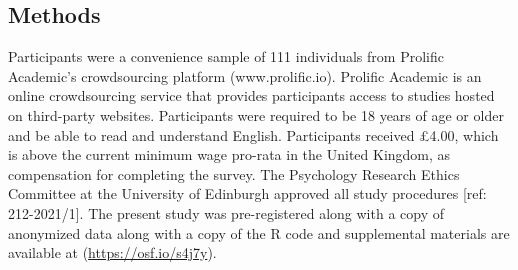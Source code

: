 \documentclass[
  donotrepeattitle,doc, 12pt, a4paper,floatsintext]{apa7}
\begin{document}
\hypertarget{methods}{%
\subsection{Methods}\label{methods}}

Participants were a convenience sample of 111 individuals from Prolific Academic's crowdsourcing platform (www.prolific.io). Prolific Academic is an online crowdsourcing service that provides participants access to studies hosted on third-party websites. Participants were required to be 18 years of age or older and be able to read and understand English. Participants received £4.00, which is above the current minimum wage pro-rata in the United Kingdom, as compensation for completing the survey. The Psychology Research Ethics Committee at the University of Edinburgh approved all study procedures {[}ref: 212-2021/1{]}. The present study was pre-registered along with a copy of anonymized data along with a copy of the R code and supplemental materials are available at (\url{https://osf.io/s4j7y}).
\end{document}
